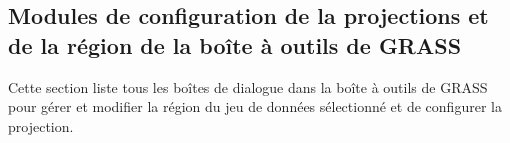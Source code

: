 \subsection{Modules de configuration de la projections et de la r\'egion de la bo\^ite \`a outils de GRASS }

Cette section liste tous les bo\^ites de dialogue dans la bo\^ite \`a outils de GRASS pour g\'erer et modifier la r\'egion du jeu de donn\'ees s\'electionn\'e et de configurer la projection.

